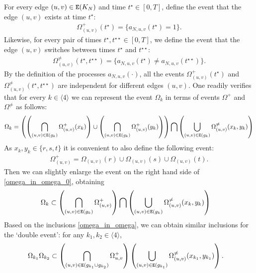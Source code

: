 \documentclass[11pt,reqno]{amsart}
\numberwithin{equation}{section}
\newcommand{\sprod}[1]{\langle#1\rangle}
\begin{document}
For every edge $(u,v)\in{\tt E}(K_N)$ and time $t^{\star}\in[0,T]$, define the event that the edge $(u,v)$ exists at time $t^{\star}$:
\begin{align*}
    \Omega_{(u,v)}^{+}(t^{\star}) = \{a_{N,u,v}(t^{\star})=1\}.
\end{align*}
Likewise, for every pair of times $t^{\star},t^{\star\star}\in[0,T]$, we define the event that the edge $(u,v)$ switches between times $t^{\star}$ and $t^{\star\star}$:
\begin{align*}
    \Omega_{(u,v)}^{\not =}({t^{\star},t^{\star\star}})= \{a_{N,u,v}(t^{\star})\not= a_{N,u,v}(t^{\star\star})\}.
\end{align*}
By the definition of the processes {$a_{N,u,v}(\cdot)$}, all the events $\Omega_{(u,v)}^{+}(t^{\star})$ and $\Omega_{(u,v)}^{\not =}({t^{\star},t^{\star\star}})$ are independent for different edges $(u,v)$. 
One readily verifies that for every $k\in\sprod{4}$ we can represent the event $\Omega_k$ in terms of events $\Omega^{+}$ and $\Omega^{\neq}$ as follows:
\begin{align}
    \Omega_k = \left(\left(\bigcap_{(u,v)\in{\tt E}(g_k)}\Omega^{+}_{{(u,v)}}(x_k)\right)\cup \left(\bigcap_{(u,v)\in{\tt E}(g_k)}\Omega^{+}_{{(u,v)}}(y_k)\right)\right){\bigcap}\left(\bigcup_{(u,v)\in{\tt E}(g_k)}\Omega^{\not =}_{(u,v)}(x_k,y_k)\right)\label{omega_in_omega_0}
\end{align}
As $x_k,y_k\in\{r,s,t\}$ it is convenient to also define the following event:
\begin{align*}
    \Omega^{+}_{(u,v)} = \Omega_{(u,v)}(r)\cup \Omega_{(u,v)}(s)\cup\Omega_{(u,v)}(t).
\end{align*}
Then we can slightly enlarge the event on the right hand side of \eqref{omega_in_omega_0}, obtaining
\begin{align}
    \Omega_k &\subset \left(\bigcap_{(u,v)\in{\tt E}(g_k)}\Omega^{+}_{{(u,v)}}\right){\bigcap}\left(\bigcup_{(u,v)\in{\tt E}(g_k)}\Omega^{\not =}_{(u,v)}(x_k,y_k)\right)\label{omega_in_omega}
\end{align}
Based on the inclusions \eqref{omega_in_omega}, we can obtain similar inclusions for the `double event': for any $k_1,k_2\in\sprod{4}$,
\begin{align}
    \Omega_{k_1}\Omega_{k_2}  &\subset \left(\bigcap_{(u,v)\in{\tt E}(g_{k_1}\cup g_{k_2})}\Omega^{+}_{u,v}\right)\left(\bigcup_{(u,v)\in{\tt E}(g_{k_1})}\Omega^{\not =}_{(u,v)}(x_{k_1},y_{k_1})\right)\label{omega_double_bound}.
\end{align}
\end{document}

